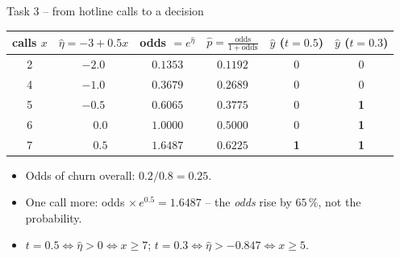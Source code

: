 \documentclass[aspectratio=169,11pt]{beamer}
\begin{document}
\begin{frame}{Task 3 -- from hotline calls to a decision}
  \begin{center}\small
  \renewcommand{\arraystretch}{1.25}
  \begin{tabular}{cccccc}
    \toprule
    calls $x$ & $\hat\eta = -3 + 0.5x$ & odds $= e^{\hat\eta}$ & $\hat p = \frac{\text{odds}}{1+\text{odds}}$ & $\hat y$ ($t = 0.5$) & $\hat y$ ($t = 0.3$)\\
    \midrule
    2 & $-2.0$ & $0.1353$ & $0.1192$ & 0 & 0\\
    4 & $-1.0$ & $0.3679$ & $0.2689$ & 0 & 0\\
    5 & $-0.5$ & $0.6065$ & $0.3775$ & 0 & \textbf{1}\\
    6 & $\phantom{-}0.0$ & $1.0000$ & $0.5000$ & 0 & \textbf{1}\\
    7 & $\phantom{-}0.5$ & $1.6487$ & $0.6225$ & \textbf{1} & \textbf{1}\\
    \bottomrule
  \end{tabular}
  \end{center}
  \begin{itemize}\setlength{\itemsep}{2pt}
    \item Odds of churn overall: $0.2/0.8 = 0.25$.
    \item One call more: odds $\times\, e^{0.5} = 1.6487$ -- the \emph{odds} rise by $65\,\%$, not the probability.
    \item $t = 0.5 \Leftrightarrow \hat\eta > 0 \Leftrightarrow x \ge 7$; \quad $t = 0.3 \Leftrightarrow \hat\eta > -0.847 \Leftrightarrow x \ge 5$.
  \end{itemize}
\end{frame}
\end{document}
